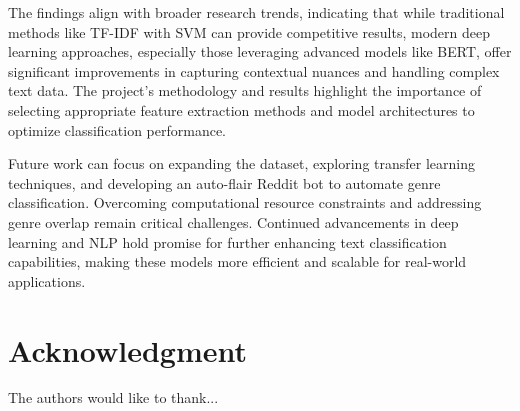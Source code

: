 \documentclass[conference]{IEEEtran}
\begin{document}
The findings align with broader research trends, indicating that while traditional methods like TF-IDF with SVM can provide competitive results, modern deep learning approaches, especially those leveraging advanced models like BERT, offer significant improvements in capturing contextual nuances and handling complex text data. The project's methodology and results highlight the importance of selecting appropriate feature extraction methods and model architectures to optimize classification performance.

Future work can focus on expanding the dataset, exploring transfer learning techniques, and developing an auto-flair Reddit bot to automate genre classification. Overcoming computational resource constraints and addressing genre overlap remain critical challenges. Continued advancements in deep learning and NLP hold promise for further enhancing text classification capabilities, making these models more efficient and scalable for real-world applications.






\section*{Acknowledgment}


The authors would like to thank...
\end{document}
